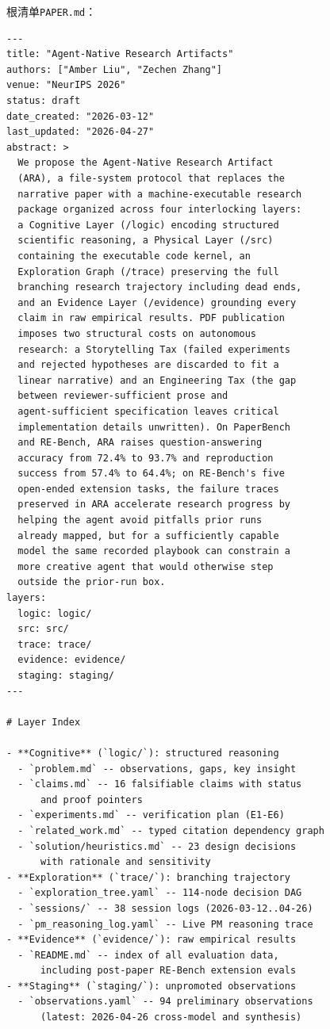\documentclass[
]{article}
\newcommand{\passthrough}[1]{#1}
\theoremstyle{definition}
\begin{document}
根清单\passthrough{\lstinline!PAPER.md!}：

\begin{lstlisting}
---
title: "Agent-Native Research Artifacts"
authors: ["Amber Liu", "Zechen Zhang"]
venue: "NeurIPS 2026"
status: draft
date_created: "2026-03-12"
last_updated: "2026-04-27"
abstract: >
  We propose the Agent-Native Research Artifact
  (ARA), a file-system protocol that replaces the
  narrative paper with a machine-executable research
  package organized across four interlocking layers:
  a Cognitive Layer (/logic) encoding structured
  scientific reasoning, a Physical Layer (/src)
  containing the executable code kernel, an
  Exploration Graph (/trace) preserving the full
  branching research trajectory including dead ends,
  and an Evidence Layer (/evidence) grounding every
  claim in raw empirical results. PDF publication
  imposes two structural costs on autonomous
  research: a Storytelling Tax (failed experiments
  and rejected hypotheses are discarded to fit a
  linear narrative) and an Engineering Tax (the gap
  between reviewer-sufficient prose and
  agent-sufficient specification leaves critical
  implementation details unwritten). On PaperBench
  and RE-Bench, ARA raises question-answering
  accuracy from 72.4% to 93.7% and reproduction
  success from 57.4% to 64.4%; on RE-Bench's five
  open-ended extension tasks, the failure traces
  preserved in ARA accelerate research progress by
  helping the agent avoid pitfalls prior runs
  already mapped, but for a sufficiently capable
  model the same recorded playbook can constrain a
  more creative agent that would otherwise step
  outside the prior-run box.
layers:
  logic: logic/
  src: src/
  trace: trace/
  evidence: evidence/
  staging: staging/
---

# Layer Index

- **Cognitive** (`logic/`): structured reasoning
  - `problem.md` -- observations, gaps, key insight
  - `claims.md` -- 16 falsifiable claims with status
      and proof pointers
  - `experiments.md` -- verification plan (E1-E6)
  - `related_work.md` -- typed citation dependency graph
  - `solution/heuristics.md` -- 23 design decisions
      with rationale and sensitivity
- **Exploration** (`trace/`): branching trajectory
  - `exploration_tree.yaml` -- 114-node decision DAG
  - `sessions/` -- 38 session logs (2026-03-12..04-26)
  - `pm_reasoning_log.yaml` -- Live PM reasoning trace
- **Evidence** (`evidence/`): raw empirical results
  - `README.md` -- index of all evaluation data,
      including post-paper RE-Bench extension evals
- **Staging** (`staging/`): unpromoted observations
  - `observations.yaml` -- 94 preliminary observations
      (latest: 2026-04-26 cross-model and synthesis)
\end{lstlisting}
\end{document}
